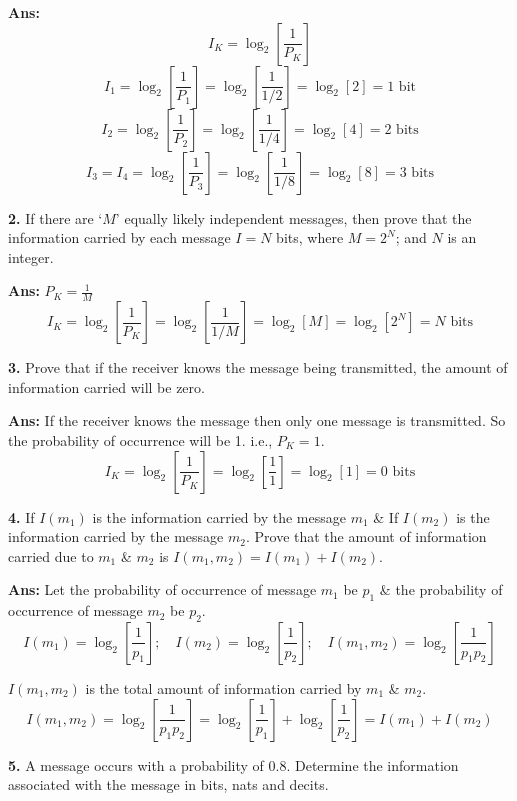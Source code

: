 \documentclass[12pt]{article}
\begin{document}
\textbf{Ans:}
$$I_K = \log_2 \left[ \frac{1}{P_K} \right]$$
$$I_1 = \log_2 \left[ \frac{1}{P_1} \right] = \log_2 \left[ \frac{1}{1/2} \right] = \log_2 [2] = 1 \text{ bit}$$
$$I_2 = \log_2 \left[ \frac{1}{P_2} \right] = \log_2 \left[ \frac{1}{1/4} \right] = \log_2 [4] = 2 \text{ bits}$$
$$I_3 = I_4 = \log_2 \left[ \frac{1}{P_3} \right] = \log_2 \left[ \frac{1}{1/8} \right] = \log_2 [8] = 3 \text{ bits}$$

\vspace{0.5cm}
\noindent \textbf{2.} If there are `$M$' equally likely independent messages, then prove that the information carried by each message $I = N$ bits, where $M = 2^N$; and $N$ is an integer.

\textbf{Ans:} $P_K = \frac{1}{M}$
$$I_K = \log_2 \left[ \frac{1}{P_K} \right] = \log_2 \left[ \frac{1}{1/M} \right] = \log_2 [M] = \log_2 [2^N] = N \text{ bits}$$

\vspace{0.5cm}
\noindent \textbf{3.} Prove that if the receiver knows the message being transmitted, the amount of information carried will be zero.

\textbf{Ans:} If the receiver knows the message then only one message is transmitted. So the probability of occurrence will be 1. i.e., $P_K = 1$.
$$I_K = \log_2 \left[ \frac{1}{P_K} \right] = \log_2 \left[ \frac{1}{1} \right] = \log_2 [1] = 0 \text{ bits}$$

\vspace{0.5cm}
\noindent \textbf{4.} If $I(m_1)$ is the information carried by the message $m_1$ \& If $I(m_2)$ is the information carried by the message $m_2$. Prove that the amount of information carried due to $m_1$ \& $m_2$ is $I(m_1, m_2) = I(m_1) + I(m_2)$.

\textbf{Ans:} Let the probability of occurrence of message $m_1$ be $p_1$ \& the probability of occurrence of message $m_2$ be $p_2$.
$$I(m_1) = \log_2 \left[ \frac{1}{p_1} \right]; \quad I(m_2) = \log_2 \left[ \frac{1}{p_2} \right]; \quad I(m_1, m_2) = \log_2 \left[ \frac{1}{p_1 p_2} \right]$$


$I(m_1, m_2)$ is the total amount of information carried by $m_1$ \& $m_2$.
$$I(m_1, m_2) = \log_2 \left[ \frac{1}{p_1 p_2} \right] = \log_2 \left[ \frac{1}{p_1} \right] + \log_2 \left[ \frac{1}{p_2} \right] = I(m_1) + I(m_2)$$

\vspace{0.5cm}
\noindent \textbf{5.} A message occurs with a probability of 0.8. Determine the information associated with the message in bits, nats and decits.
\end{document}

